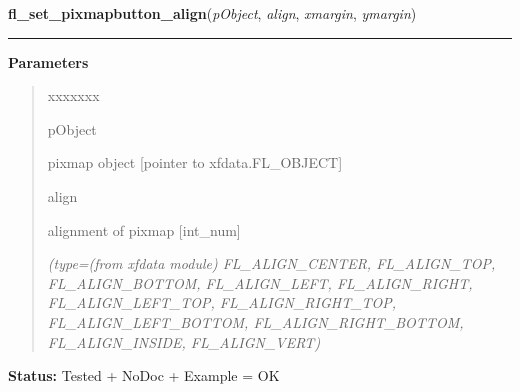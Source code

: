 \hspace{.8\funcindent}\begin{boxedminipage}{\funcwidth}

    \raggedright \textbf{fl\_set\_pixmapbutton\_align}(\textit{pObject}, \textit{align}, \textit{xmargin}, \textit{ymargin})

    \vspace{-1.5ex}

    \rule{\textwidth}{0.5\fboxrule}
\setlength{\parskip}{2ex}
\setlength{\parskip}{1ex}
      \textbf{Parameters}
      \vspace{-1ex}

      \begin{quote}
        \begin{Ventry}{xxxxxxx}

          \item[pObject]

          pixmap object [pointer to xfdata.FL\_OBJECT]

          \item[align]

          alignment of pixmap [int\_num]

            {\it (type=(from xfdata module) FL\_ALIGN\_CENTER, FL\_ALIGN\_TOP, FL\_ALIGN\_BOTTOM, 
FL\_ALIGN\_LEFT, FL\_ALIGN\_RIGHT, FL\_ALIGN\_LEFT\_TOP, 
FL\_ALIGN\_RIGHT\_TOP, FL\_ALIGN\_LEFT\_BOTTOM, FL\_ALIGN\_RIGHT\_BOTTOM, 
FL\_ALIGN\_INSIDE, FL\_ALIGN\_VERT)}

        \end{Ventry}

      \end{quote}

\textbf{Status:} Tested + NoDoc + Example = OK



    \end{boxedminipage}

    \label{xformslib:library:fl_set_pixmap_pixmap}

    \vspace{0.5ex}

